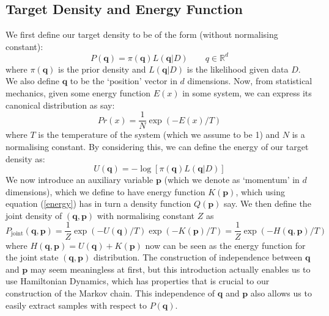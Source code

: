 \documentclass[11pt]{article}
\begin{document}
\subsection{Target Density and Energy Function}
We first define our target density to be of the form (without normalising constant):
\begin{equation}
P(\mathbf{q})= \pi(\mathbf{q})L(\mathbf{q}|D) \quad \quad q \in \mathbb{R}^{d}
\end{equation}
where $\pi(\mathbf{q})$ is the prior density and $L(\mathbf{q}|D)$ is the likelihood given data $D$. 
We also define $\mathbf{q}$ to be the `position' vector in $d$ dimensions. Now, from statistical mechanics, given some energy function $E(x)$ in some system, we can express its canonical distribution as say:
\begin{equation}
\label{energy}
Pr(x) = \frac{1}{N}\exp(-E(x)/T)
\end{equation}
where $T$ is the temperature of the system (which we assume to be 1) and $N$ is a normalising constant. By considering this, we can define the energy of our target density as:
\begin{equation}
U(\mathbf{q}) = -\log [\pi(\mathbf{q})L(\mathbf{q}|D)]
\end{equation}
We now introduce an auxiliary variable $\mathbf{p}$ (which we denote as `momentum' in $d$ dimensions), which we define to have energy function $K(\mathbf{p})$, which using equation (\ref{energy}) has in turn a density function $Q(\mathbf{p})$ say. We then define the joint density of $(\mathbf{q},\mathbf{p})$ with normalising constant $Z$ as 
\begin{equation}
\label{joint}
P_{\text{joint}}(\mathbf{q},\mathbf{p}) = \frac{1}{Z}\exp(-U(\mathbf{q})/T)\exp(-K(\mathbf{p})/T) = \frac{1}{Z}\exp(-H(\mathbf{q},\mathbf{p})/T)
\end{equation}
where $H(\mathbf{q},\mathbf{p}) = U(\mathbf{q}) + K(\mathbf{p})$ now can be seen as the energy function for the joint state $(\mathbf{q},\mathbf{p})$ distribution. The construction of independence between $\mathbf{q}$ and $\mathbf{p}$ may seem meaningless at first, but this introduction actually enables us to use Hamiltonian Dynamics, which has properties that is crucial to our construction of the Markov chain. This independence of $\mathbf{q}$ and $\mathbf{p}$ also allows us to easily extract samples with respect to $P(\mathbf{q})$.
\end{document}
